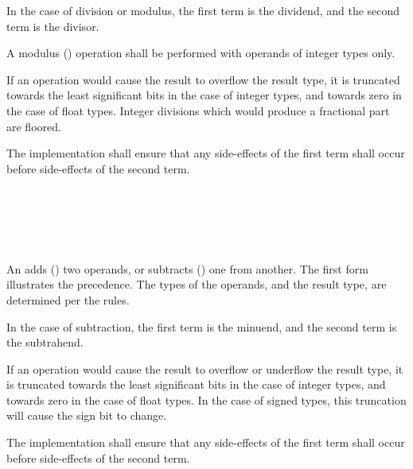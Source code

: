 \specsubsubitem
In the case of division or modulus, the first term is the dividend, and the
second term is the divisor.

\specsubsubitem
A modulus (\terminal{\%}) operation shall be performed with operands of integer
types only.

\specsubsubitem
If an operation would cause the result to overflow the result type, it is
truncated towards the least significant bits in the case of integer types, and
towards zero in the case of float types. Integer divisions which would produce
a fractional part are floored.

\specsubsubitem
The implementation shall ensure that any side-effects of the first term shall
occur before side-effects of the second term.


\begin{grammar}
 \\
	 \\
	 \terminal{+}  \\
	 \terminal{-}  \\
\end{grammar}

\specsubsubitem
An  adds (\terminal{+}) two operands, or
subtracts (\terminal{-}) one from another. The first form illustrates the
precedence. The types of the operands, and the result type, are determined per
the  rules.

\specsubsubitem
In the case of subtraction, the first term is the minuend, and the second term
is the subtrahend.

\specsubsubitem
If an operation would cause the result to overflow or underflow the result
type, it is truncated towards the least significant bits in the case of integer
types, and towards zero in the case of float types. In the case of signed
types, this truncation will cause the sign bit to change.

\specsubsubitem
The implementation shall ensure that any side-effects of the first term shall
occur before side-effects of the second term.


\begin{grammar}
 \\
	 \\
	 \terminal{\textless{}\textless{}}  \\
	 \terminal{\textgreater{}\textgreater{}}  \\
\end{grammar}

